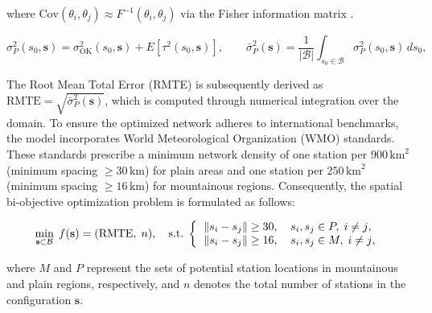 \documentclass[10pt,twoside]{article}
\numberwithin{equation}{section}
\begin{document}
where $\text{Cov}(\theta_i,\theta_j) \approx F^{-1}(\theta_i,\theta_j)$ via the Fisher information matrix . %

\begin{equation}\label{eq:totalerror}

\sigma^2_P(s_0, \mathbf{s}) = \sigma^2_{\text{OK}}(s_0, \mathbf{s}) + E[\tau^2(s_0, \mathbf{s})], \qquad

\bar{\sigma}^2_P(\mathbf{s}) = \frac{1}{|\mathcal{B}|} \int_{s_0 \in \mathcal{B}} \sigma^2_P(s_0, \mathbf{s})\, ds_0,

\end{equation}

The Root Mean Total Error (RMTE) is subsequently derived as $\text{RMTE} = \sqrt{\bar{\sigma}^2_P(\mathbf{s})}$, which is computed through numerical integration over the domain. To ensure the optimized network adheres to international benchmarks, the model incorporates World Meteorological Organization (WMO) standards. These standards prescribe a minimum network density of one station per $900\,\text{km}^2$ (minimum spacing $\geq 30\,\text{km}$) for plain areas and one station per $250\,\text{km}^2$ (minimum spacing $\geq 16\,\text{km}$) for mountainous regions. Consequently, the spatial bi-objective optimization problem is formulated as follows:

\begin{equation}\label{eq:problem}

\min_{\mathbf{s} \subset \mathcal{B}}\; f(\mathbf{s}) = (\text{RMTE},\; n), \quad \text{s.t.} \;

\left\{

\begin{tabular}{ll}

$\|s_i - s_j\| \geq 30$, & $s_i, s_j \in P,\; i \neq j$,\\

$\|s_i - s_j\| \geq 16$, & $s_i, s_j \in M,\; i \neq j$,

\end{tabular}

\right.

\end{equation}

where $M$ and $P$ represent the sets of potential station locations in mountainous and plain regions, respectively, and $n$ denotes the total number of stations in the configuration $\mathbf{s}$.
\end{document}
